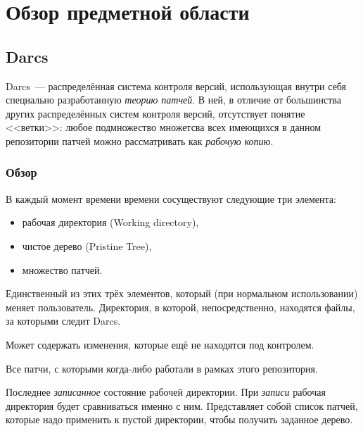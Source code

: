 \chapter{Обзор предметной области}
\label{chapter1}

\section{Darcs}

Darcs~--- распределённая система контроля версий, использующая внутри
себя специально разработанную \emph{теорию патчей}. В ней, в отличие
от большинства других распределённых систем контроля версий,
отсутствует понятие <<ветки>>: любое подмножество множетсва всех
имеющихся в данном репозитории патчей можно рассматривать как
\emph{рабочую копию}.

\subsection{Обзор}

В каждый момент времени времени сосуществуют следующие три
элемента: %

\begin{itemize}
\item рабочая директория (Working directory),
\item чистое дерево (Pristine Tree),
\item множество патчей.
\end{itemize}

\begin{definition}
  Единственный из этих трёх элементов, который (при нормальном
  использовании) меняет пользователь. Директория, в которой,
  непосредственно, находятся файлы, за которыми следит Darcs.

  Может содержать изменения, которые ещё не находятся под контролем.
\end{definition}

\begin{definition}
  Все патчи, с которыми когда-либо работали в рамках этого репозитория.
\end{definition}

\begin{definition}
  Последнее \emph{записанное} состояние рабочей директории. При
  \emph{записи} рабочая директория будет сравниваться именно с ним.
  Представляет собой список патчей, которые надо применить к пустой
  директории, чтобы получить заданное дерево.
\end{definition}

